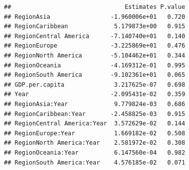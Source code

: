 \documentclass[11pt,]{article}
\newenvironment{Shaded}{\begin{snugshade}}{\end{snugshade}}
\newcommand{\CommentTok}[1]{\textcolor[rgb]{0.56,0.35,0.01}{\textit{#1}}}
\newcommand{\FloatTok}[1]{\textcolor[rgb]{0.00,0.00,0.81}{#1}}
\newcommand{\KeywordTok}[1]{\textcolor[rgb]{0.13,0.29,0.53}{\textbf{#1}}}
\newcommand{\NormalTok}[1]{#1}
\newcommand{\OperatorTok}[1]{\textcolor[rgb]{0.81,0.36,0.00}{\textbf{#1}}}
\newcommand{\StringTok}[1]{\textcolor[rgb]{0.31,0.60,0.02}{#1}}
\begin{document}
\begin{Shaded}
\end{Shaded}

\begin{verbatim}
##                                Estimates P.value
## RegionAsia                 -1.960006e+01   0.720
## RegionCaribbean             5.179873e+00   0.915
## RegionCentral America      -7.140740e+01   0.140
## RegionEurope               -3.225869e+01   0.476
## RegionNorth America        -5.104462e+01   0.344
## RegionOceania              -4.169312e-01   0.995
## RegionSouth America        -9.102361e+01   0.065
## GDP.per.capita              3.217625e-07   0.698
## Year                       -2.095431e-02   0.359
## RegionAsia:Year             9.779824e-03   0.686
## RegionCaribbean:Year       -2.458825e-03   0.915
## RegionCentral America:Year  3.572629e-02   0.144
## RegionEurope:Year           1.669182e-02   0.508
## RegionNorth America:Year    2.581972e-02   0.308
## RegionOceania:Year          6.147560e-04   0.982
## RegionSouth America:Year    4.576185e-02   0.071
\end{verbatim}
\end{document}

